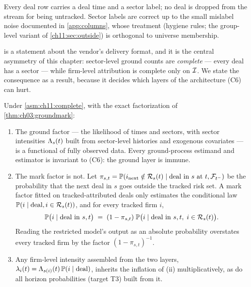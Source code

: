 \begin{assumption}\label{asm:ch11:complete}
Every deal row carries a deal time and a sector label; no deal is dropped
from the stream for being untracked. Sector labels are correct up to the
small mislabel noise documented in \cref{app:columns}, whose treatment
(hygiene rules; the group-level variant of
\cref{ch11:sec:outside}) is orthogonal to universe membership.
\end{assumption}

 is a statement about the vendor's delivery
format, and it is the central asymmetry of this chapter: sector-level
ground counts are \emph{complete} --- every deal has a sector --- while
firm-level attribution is complete only on $\mathcal{I}$. We state the
consequence as a result, because it decides which layers of the
architecture (C6) can hurt.

\begin{proposition}\label{prop:ch11:asymmetry}
Under \cref{asm:ch11:complete}, with the exact factorization of
\cref{thm:ch03:groundmark}:
\begin{enumerate}[label=(\roman*)]
\item The ground factor --- the likelihood of times and sectors, with
sector intensities $\Lambda_s(t)$ built from sector-level histories and
exogenous covariates --- is a functional of fully observed data. Every
ground-process estimand and estimator is invariant to (C6): the ground
layer is immune.
\item The mark factor is not. Let $\pi_{s,t} = \mathbb{P}(i_{\text{next}}
\notin \mathcal{R}_s(t) \mid \text{deal in } s \text{ at } t, \mathcal{F}_{t^-})$ be the
probability that the next deal in $s$ goes outside the tracked risk set.
A mark factor fitted on tracked-attributed deals only estimates the
conditional law $\mathbb{P}(i \mid \text{deal}, i \in \mathcal{R}_s(t))$, and for
every tracked firm $i$,
\begin{equation}\label{eq:ch11:inflation}
\mathbb{P}\big(i \mid \mathrm{deal\ in\ } s,t \big)
 \;=\;
 (1 - \pi_{s,t})\;
 \mathbb{P}\big(i \mid \mathrm{deal\ in\ } s,t,\; i \in \mathcal{R}_s(t)\big).
\end{equation}
Reading the restricted model's output as an absolute probability
overstates every tracked firm by the factor $(1-\pi_{s,t})^{-1}$.
\item Any firm-level intensity assembled from the two layers,
$\lambda_i(t) = \Lambda_{s(i)}(t)\,\mathbb{P}(i \mid \mathrm{deal})$, inherits the
inflation of (ii) multiplicatively, as do all horizon probabilities
(target T3) built from it.
\end{enumerate}
\end{proposition}

